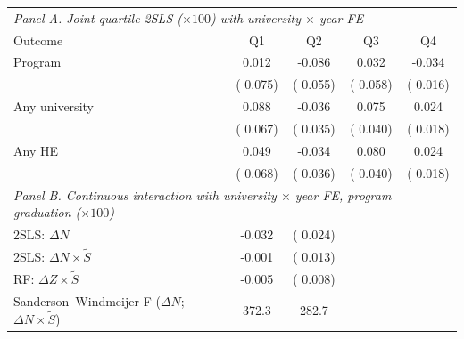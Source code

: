 \begin{tabular}{lcccc}
\toprule
\multicolumn{5}{l}{\textit{Panel A. Joint quartile 2SLS (\(\times 100\)) with university \(\times\) year FE}} \\
Outcome & Q1 & Q2 & Q3 & Q4 \\
\midrule
Program &   0.012 &  -0.086 &   0.032 &  -0.034\sym{**} \\
 & ( 0.075) & ( 0.055) & ( 0.058) & ( 0.016) \\
Any university &   0.088 &  -0.036 &   0.075\sym{*} &   0.024 \\
 & ( 0.067) & ( 0.035) & ( 0.040) & ( 0.018) \\
Any HE &   0.049 &  -0.034 &   0.080\sym{**} &   0.024 \\
 & ( 0.068) & ( 0.036) & ( 0.040) & ( 0.018) \\
\midrule
\multicolumn{5}{l}{\textit{Panel B. Continuous interaction with university \(\times\) year FE, program graduation (\(\times 100\))}} \\
2SLS: \(\Delta N\) &  -0.032 & ( 0.024) & & \\
2SLS: \(\Delta N \times \tilde S\) &  -0.001 & ( 0.013) & & \\
RF: \(\Delta Z \times \tilde S\) &  -0.005 & ( 0.008) & & \\
Sanderson--Windmeijer F (\(\Delta N\); \(\Delta N\times\tilde S\)) &  372.3 &  282.7 & & \\
\bottomrule
\end{tabular}
